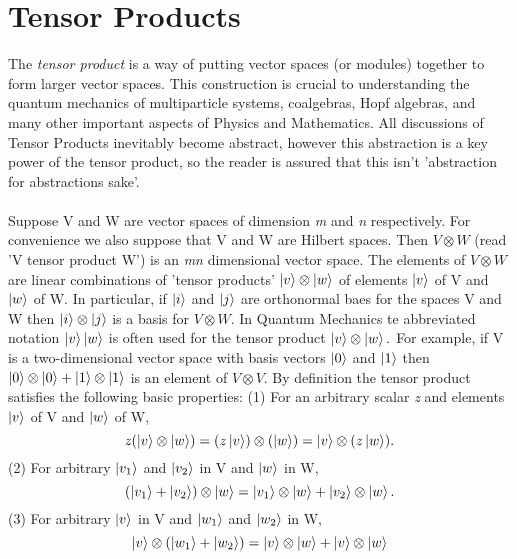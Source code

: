 \documentclass[preprint, 5p, 10pt]{elsarticle}
\theoremstyle{plain}
\begin{document}
\section{Tensor Products}\label{TP}
The \textit{tensor product} is a way of putting vector spaces (or modules) together to form larger vector 
spaces. This construction is crucial to understanding the quantum mechanics of multiparticle systems, 
coalgebras, Hopf algebras, and many other important aspects of Physics and Mathematics. 
All discussions of Tensor Products inevitably become abstract, however this abstraction is a key power 
of the tensor product, so the reader is assured that this isn't 'abstraction for abstractions sake'. 
\paragraph{}
Suppose V and W are vector spaces of dimension \textit{m} and \textit{n} respectively. For convenience
we also suppose that V and W are Hilbert spaces. Then $V\otimes W$ (read 'V tensor product W') is an
\textit{mn} dimensional vector space.
 The elements of $V \otimes W$ are linear combinations of 'tensor products' $\ket{v} \otimes \ket{w}$
of elements $\ket{v}$ of V and $\ket{w}$ of W. In particular, if $\ket{i}$ and $\ket{j}$ 
are orthonormal baes for the spaces V and W then $\ket{i}\otimes \ket{j}$ is a basis for $V \otimes W.$
In Quantum Mechanics te abbreviated notation $\ket{v}\ket{w}$ is often used for the tensor product $\ket{v}
\otimes \ket{w}.$ For example, if V is a two-dimensional vector space with basis vectors $\ket{0}$ and 
$\ket{1}$ then $\ket{0}\otimes \ket{0} + \ket{1} \otimes \ket{1}$ is an element of $V \otimes V.$
\newline  By definition the tensor product satisfies the following basic properties:
(1) For an arbitrary scalar \textit{z} and elements $\ket{v}$ of V and $\ket{w}$ of W,
\begin{equation}
 \mathit{z}(\ket{v} \otimes \ket{w}) = (z\ket{v})\otimes(\ket{w}) = \ket{v} \otimes (z\ket{w}).
\end{equation} 
(2) For arbitrary $\ket{v_{1}}$ and $\ket{v_{2}}$ in V and $\ket{w}$ in W,
\begin{equation}
 (\ket{v_{1}} + \ket{v_{2}})\otimes\ket{w}=\ket{v_{1}}\otimes \ket{w} + \ket{v_{2}}\otimes \ket{w}.
\end{equation}
(3) For arbitrary $\ket{v}$ in V and $\ket{w_{1}}$ and $\ket{w_{2}}$ in W,
\begin{equation}
 \ket{v} \otimes (\ket{w_{1}}+\ket{w_{2}}) = \ket{v}\otimes \ket{w} + \ket{v}\otimes \ket{w}
\end{equation}
\end{document}
